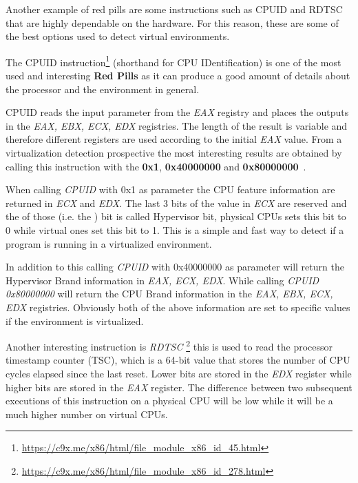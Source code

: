 Another example of red pills are some instructions such as CPUID and RDTSC that are highly dependable on the hardware. For this reason, these are some of the best options used to detect virtual environments.




The CPUID instruction\footnote{\url{https://c9x.me/x86/html/file_module_x86_id_45.html}} (shorthand for CPU IDentification) is one of the most used and interesting \textbf{Red Pills} as it can produce a good amount of details about the processor and the environment in general.

CPUID reads the input parameter from the \textit{EAX} registry and places the outputs in the \textit{EAX, EBX, ECX, EDX} registries. The length of the result is variable and therefore different registers are used according to the initial \textit{EAX} value. From a virtualization detection prospective the most interesting results are obtained by calling this instruction with the \textbf{0x1}, \textbf{0x40000000} and \textbf{0x80000000}~\cite{CPUID}. 

When calling \textit{CPUID} with 0x1 as parameter the CPU feature information are returned in \textit{ECX} and \textit{EDX}. The last 3 bits of the value in \textit{ECX} are reserved and the  of those (i.e. the ) bit is called Hypervisor bit, physical CPUs sets this bit to 0 while virtual ones set this bit to 1. This is a simple and fast way to detect if a program is running in a virtualized environment. 

In addition to this calling \textit{CPUID} with 0x40000000 as parameter will return the Hypervisor Brand information in \textit{EAX, ECX, EDX}. While calling \textit{CPUID 0x80000000} will return the CPU Brand information in the \textit{EAX, EBX, ECX, EDX} registries. Obviously both of the above information are set to specific values if the environment is virtualized. 

Another interesting instruction is \textit{RDTSC} \footnote{\url{https://c9x.me/x86/html/file_module_x86_id_278.html}} this is used to read the processor timestamp counter (TSC), which is a 64-bit value that stores the number of CPU cycles elapsed since the last reset. Lower bits are stored in the \textit{EDX} register while higher bits are stored in the \textit{EAX} register. The difference between two subsequent executions of this instruction on a physical CPU will be low while it will be a much higher number on virtual CPUs.

